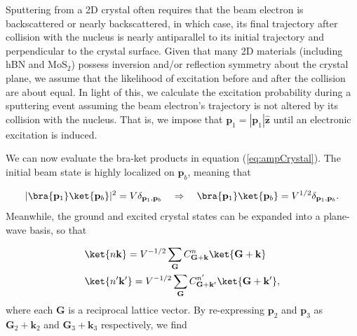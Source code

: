 \documentclass{article}
\begin{document}
Sputtering from a 2D crystal often requires that the beam electron is
backscattered or nearly backscattered, in which case, its final trajectory
after collision with the nucleus is nearly antiparallel to its initial
trajectory and perpendicular to the crystal surface.
Given that many 2D materials (including hBN and MoS$_2$) possess inversion
and/or reflection symmetry about the crystal plane, we assume that the
likelihood of excitation before and after the collision are about equal.
In light of this, we calculate the excitation probability during a sputtering event
assuming the beam electron's trajectory is not altered by its collision with
the nucleus.
That is, we impose that $\mathbf{p}_1 = |\mathbf{p}_1|\hat{\mathbf{z}}$ until
an electronic excitation is induced.

We can now evaluate the bra-ket products in equation (\ref{eq:ampCrystal}).
The initial beam state is highly localized on $\mathbf{p}_b$, meaning that

\begin{equation} 
  \label{eq:phi_1}
    |\bra{\mathbf{p}_1}\ket{\mathbf{p}_b}|^2
    =
    V\delta_{\mathbf{p}_1,\mathbf{p}_b}
    \quad\Rightarrow\quad
    \bra{\mathbf{p}_1}\ket{\mathbf{p}_b}
    =
    V^{1/2}\delta_{\mathbf{p}_1,\mathbf{p}_b}.
\end{equation}
%
Meanwhile, the ground and excited crystal states can be expanded into a
plane-wave basis, so that

\begin{equation} 
  \begin{aligned}
    &\ket{n\mathbf{k}}
    =
    V^{-1/2}\sum_{\mathbf{G}}
    C_{\mathbf{G+k}}^n \ket{\mathbf{G+k}}
    \\& \ket{n'\mathbf{k'}}
    =
    V^{-1/2}\sum_{\mathbf{G}} C_{\mathbf{G+k'}}^{n'} \ket{\mathbf{G+k'}},
  \end{aligned}
\end{equation}
%
where each $\mathbf{G}$ is a reciprocal lattice vector.
By re-expressing $\mathbf{p}_2$ and $\mathbf{p}_3$ as $\mathbf{G}_2+\mathbf{k}_2$ and
$\mathbf{G}_3 + \mathbf{k}_3$ respectively, we find
\end{document}
